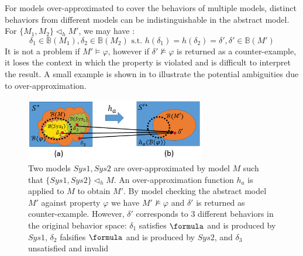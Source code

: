 For models over-approximated to cover the behaviors of multiple models, distinct behaviors from different models can be indistinguishable in the abstract model. For $\{M_1,M_2\}\triangleleft_h M'$, we may have :
$$ \delta_1\in\mathbb{B}(M_1),\delta_2\in \mathbb{B}(M_2)\text{ s.t. }h(\delta_1)=h(\delta_2)=\delta',\delta'\in \mathbb{B}(M')$$
It is not a problem if $M'\models\varphi$, however if $\delta'\not\models\varphi$ is returned as a counter-example, it loses the context in which the property is violated and is difficult to interpret the result. A small example is shown in  to illustrate the potential ambiguities due to over-approximation. 


\begin{figure}[!t]
		\centering
		\includegraphics[width=0.7\textwidth]{figs/distinction.png}
		\caption{\small Two models $Sys1,Sys2$ are over-approximated by model $M$ such that $\{Sys1,Sys2\}\triangleleft_h M$. An over-approximation function $h_a$ is applied to $M$ to obtain $M'$. By model checking the abstract model $M'$ against property $\varphi$ we have $M'\not\models\varphi$ and $\delta'$ is returned as counter-example. However, $\delta'$ corresponds to 3 different behaviors in the original behavior space: $\delta_1$ satisfies $\formula$ and is produced by $Sys1$, $\delta_2$ falsifies $\formula$ and is produced by $Sys2$, and $\delta_3$ unsatisfied and invalid}
		\label{fig:ambiguity}
\end{figure}

